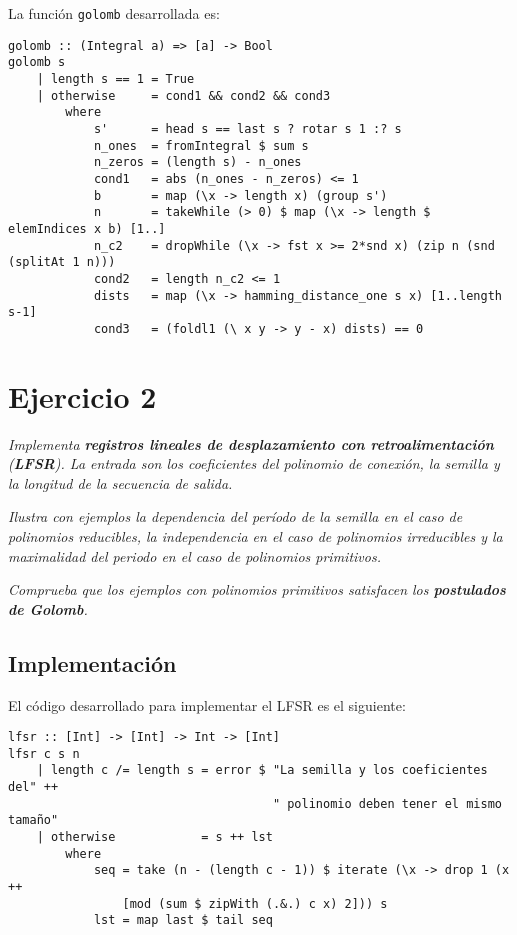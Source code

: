 \documentclass[10pt,spanish]{article}
\begin{document}
La función \texttt{golomb} desarrollada es:

\begin{verbatim}
golomb :: (Integral a) => [a] -> Bool
golomb s 
    | length s == 1 = True
    | otherwise     = cond1 && cond2 && cond3
        where
            s'      = head s == last s ? rotar s 1 :? s
            n_ones  = fromIntegral $ sum s
            n_zeros = (length s) - n_ones
            cond1   = abs (n_ones - n_zeros) <= 1
            b       = map (\x -> length x) (group s')
            n       = takeWhile (> 0) $ map (\x -> length $ elemIndices x b) [1..]
            n_c2    = dropWhile (\x -> fst x >= 2*snd x) (zip n (snd (splitAt 1 n))) 
            cond2   = length n_c2 <= 1
            dists   = map (\x -> hamming_distance_one s x) [1..length s-1]
            cond3   = (foldl1 (\ x y -> y - x) dists) == 0
\end{verbatim}

\section{\textcolor{azul}Ejercicio 2}
\textit{Implementa \textbf{\textcolor{azul}{registros lineales de desplazamiento con retroalimentación}} (\textbf{\textcolor{azul}{LFSR}}). La entrada son los coeficientes del polinomio de conexión, la semilla y la longitud de la secuencia de salida.}

\textit{Ilustra con ejemplos la dependencia del período de la semilla en el caso de polinomios reducibles, la independencia en el caso de polinomios irreducibles y la maximalidad del periodo en el caso de polinomios primitivos.}

\textit{Comprueba que los ejemplos con polinomios primitivos satisfacen los \textbf{\textcolor{azul}{postulados de Golomb}}.}

\subsection{\textcolor{azul}Implementación}
El código desarrollado para implementar el LFSR es el siguiente:

\begin{verbatim}
lfsr :: [Int] -> [Int] -> Int -> [Int]
lfsr c s n
    | length c /= length s = error $ "La semilla y los coeficientes del" ++
                                     " polinomio deben tener el mismo tamaño"
    | otherwise            = s ++ lst
        where
            seq = take (n - (length c - 1)) $ iterate (\x -> drop 1 (x ++ 
                [mod (sum $ zipWith (.&.) c x) 2])) s
            lst = map last $ tail seq
\end{verbatim}
\end{document}
